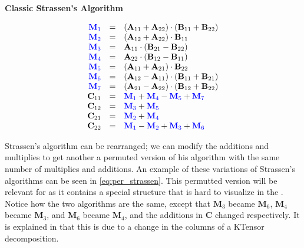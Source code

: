     \begin{center}
        \textbf{Classic Strassen's Algorithm}
        \vspace{-20pt}
    \end{center}
    \begin{equation}
        \begin{array}{rcl}
            \color{blue} \mathbf{M}_1 & = & (\mathbf{A}_{11} + \mathbf{A}_{22})\cdot (\mathbf{B}_{11} + \mathbf{B}_{22}) \\
            \color{blue} \mathbf{M}_2 & = & (\mathbf{A}_{12} + \mathbf{A}_{22})\cdot \mathbf{B}_{11} \\
            \color{blue} \mathbf{M}_3 & = & \mathbf{A}_{11}\cdot (\mathbf{B}_{21} - \mathbf{B}_{22}) \\
            \color{blue} \mathbf{M}_4 & = & \mathbf{A}_{22}\cdot (\mathbf{B}_{12} - \mathbf{B}_{11}) \\
            \color{blue} \mathbf{M}_5 & = & (\mathbf{A}_{11} + \mathbf{A}_{21})\cdot \mathbf{B}_{22} \\
            \color{blue} \mathbf{M}_6 & = & (\mathbf{A}_{12} - \mathbf{A}_{11})\cdot (\mathbf{B}_{11} + \mathbf{B}_{21}) \\
            \color{blue} \mathbf{M}_7 & = & (\mathbf{A}_{21} - \mathbf{A}_{22})\cdot (\mathbf{B}_{12} + \mathbf{B}_{22}) \\
            \mathbf{C}_{11} & = & \color{blue} \mathbf{M}_1 \color{black} + \color{blue} \mathbf{M}_4 \color{black} - \color{blue} \mathbf{M}_5 \color{black} + \color{blue} \mathbf{M}_7 \\
            \mathbf{C}_{12} & = & \color{blue} \mathbf{M}_3 \color{black} + \color{blue} \mathbf{M}_5 \\
            \mathbf{C}_{21} & = & \color{blue} \mathbf{M}_2 \color{black} + \color{blue} \mathbf{M}_4 \\
            \mathbf{C}_{22} & = & \color{blue} \mathbf{M}_1 \color{black} - \color{blue} \mathbf{M}_2 \color{black} + \color{blue} \mathbf{M}_3 \color{black} + \color{blue} \mathbf{M}_6
        \end{array}
        \label{eq:classic_strassen}
    \end{equation}

    Strassen's algorithm can be rearranged; we can modify the additions and
    multiplies to get another a permuted version of his algorithm with the same
    number of multiplies and additions. An example of these variations of
    Strassen's algorithms can be seen in \ref{eq:per_strassen}. This permutted
    version will be relevant for  as it contains a
    special structure that is hard to visualize in the
    . Notice how the two algorithms are the same,
    except that $\mathbf M_3$ became $\mathbf M_6$, $\mathbf M_4$ became
    $\mathbf M_3$, and $\mathbf M_6$ became $\mathbf M_4$, and the additions in
    $\mathbf C$ changed respectively. It is explained in  that this is due to a change in
    the columns of a KTensor decomposition. 

